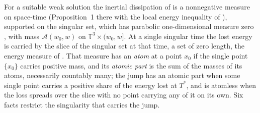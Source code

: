 \documentclass[letterpaper,twocolumn]{article}
\newcommand{\T}{\mathbb{T}}
\newcommand{\A}{\mathcal{A}}
\begin{document}
For a suitable weak solution the inertial dissipation of \cite{DucRob00}
is a nonnegative measure on space-time (Proposition~1 there with the
local energy inequality of \cite{CafKohNir82}), supported on the singular
set, which has parabolic one-dimensional measure zero \cite{CafKohNir82},
with mass $\A(w_0,w)$ on $\T^3 \times (w_0,w]$. At a single singular time
the lost energy is carried by the slice of the singular set at that time,
a set of zero length, the energy measure of \cite{LesShv18}. That measure
has an \emph{atom} at a point $x_0$ if the single point $\{x_0\}$ carries
positive mass, and its \emph{atomic part} is the sum of the masses of its
atoms, necessarily countably many; the jump has an atomic part when some
single point carries a positive share of the energy lost at $T^*$, and is
atomless when the loss spreads over the slice with no point carrying any
of it on its own. Six facts restrict the singularity that carries the
jump.
\end{document}
